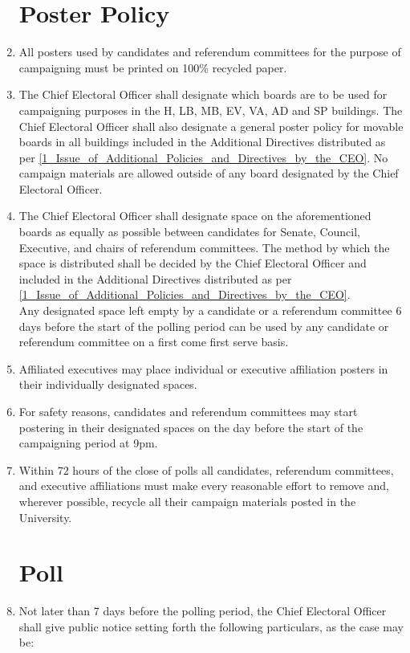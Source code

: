 \documentclass[oneside]{book}
\begin{document}
\begin{enumerate}
\section{\label{Poster_Policy}Poster Policy }
\item All posters used by candidates and referendum committees for the purpose
of campaigning must be printed on 100\% recycled paper.
\item The Chief Electoral Officer shall designate which boards are to be
used for campaigning purposes in the H, LB, MB, EV, VA, AD and SP
buildings. The Chief Electoral Officer shall also designate a general
poster policy for movable boards in all buildings included in the
Additional Directives distributed as per \autoref{1_Issue_of_Additional_Policies_and_Directives_by_the_CEO}.
No campaign materials are allowed outside of any board designated
by the Chief Electoral Officer. 
\item The Chief Electoral Officer shall designate space on the aforementioned
boards as equally as possible between candidates for Senate, Council,
Executive, and chairs of referendum committees. The method by which
the space is distributed shall be decided by the Chief Electoral Officer
and included in the Additional Directives distributed as per 
\autoref{1_Issue_of_Additional_Policies_and_Directives_by_the_CEO}. \\
 Any designated space left empty by a candidate or a referendum committee
6 days before the start of the polling period can be used by any candidate
or referendum committee on a first come first serve basis. 
\item Affiliated executives may place individual or executive affiliation
posters in their individually designated spaces. 
\item For safety reasons, candidates and referendum committees may start
postering in their designated spaces on the day before the start of
the campaigning period at 9pm. 
\item \label{enu:poster-takedown-requirement}Within 72 hours of the close
of polls all candidates, referendum committees, and executive affiliations
must make every reasonable effort to remove and, wherever possible,
recycle all their campaign materials posted in the University. 

\section{\label{Poll}Poll }
\item Not later than 7 days before the polling period, the Chief Electoral
Officer shall give public notice setting forth the following particulars,
as the case may be: 


\end{enumerate}
\end{document}
